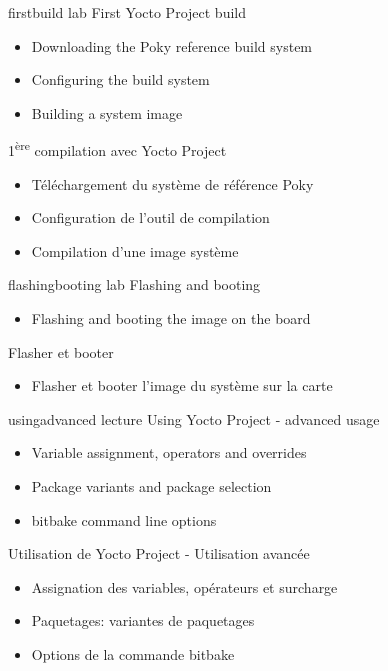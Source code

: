 {firstbuild}
{lab}
{First Yocto Project build}
{
  \begin{itemize}
  \item Downloading the Poky reference build system
  \item Configuring the build system
  \item Building a system image
 \end{itemize}
}
{1\textsuperscript{ère} compilation avec Yocto Project}
{
  \begin{itemize}
  \item Téléchargement du système de référence Poky
  \item Configuration de l'outil de compilation
  \item Compilation d'une image système
 \end{itemize}
}

{flashingbooting}
{lab}
{Flashing and booting}
{
  \begin{itemize}
  \item Flashing and booting the image on the board
  \end{itemize}
}
{Flasher et booter}
{
  \begin{itemize}
  \item Flasher et booter l'image du système sur la carte
  \end{itemize}
}

{usingadvanced}
{lecture}
{Using Yocto Project - advanced usage}
{
  \begin{itemize}
  \item Variable assignment, operators and overrides
  \item Package variants and package selection
  \item bitbake command line options
  \end{itemize}
}
{Utilisation de Yocto Project - Utilisation avancée}
{
  \begin{itemize}
  \item Assignation des variables, opérateurs et surcharge
  \item Paquetages: variantes de paquetages
  \item Options de la commande bitbake
  \end{itemize}
}

